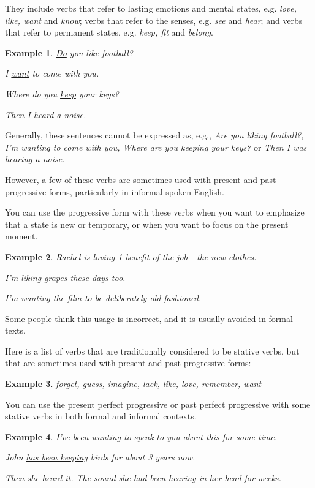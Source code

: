 \documentclass[oneside]{book}
\numberwithin{equation}{section}
\newtheorem{example}{Example}[section]
\begin{document}
They include verbs that refer to lasting emotions and mental states, e.g. \textit{love, like, want} and \textit{know}; verbs that refer to the senses, e.g. \textit{see} and \textit{hear}; and verbs that refer to permanent states, e.g. \textit{keep, fit} and \textit{belong}.
\begin{example}
    \underline{Do} you like football?
    
    I \underline{want} to come with you.
    
    Where do you \underline{keep} your keys?
    
    Then I \underline{heard} a noise.
\end{example}
Generally, these sentences cannot be expressed as, e.g., \textit{Are you liking football?, I'm wanting to come with you, Where are you keeping your keys?} or \textit{Then I was hearing a noise}.

%
However, a few of these verbs are sometimes used with present and past progressive forms, particularly in informal spoken English.

You can use the progressive form with these verbs when you want to emphasize that a state is new or temporary, or when you want to focus on the present moment.
\begin{example}
    Rachel \underline{is loving} 1 benefit of the job - the new clothes.
    
    I\underline{'m liking} grapes these days too.
    
    I\underline{'m wanting} the film to be deliberately old-fashioned.
\end{example}
Some people think this usage is incorrect, and it is usually avoided in formal texts.

%
Here is a list of verbs that are traditionally considered to be stative verbs, but that are sometimes used with present and past progressive forms:
\begin{example}
    forget, guess, imagine, lack, like, love, remember, want
\end{example}
You can use the present perfect progressive or past perfect progressive with some stative verbs in both formal and informal contexts.
\begin{example}
    I\underline{'ve been wanting} to speak to you about this for some time.
    
    John \underline{has been keeping} birds for about 3 years now.
    
    Then she heard it. The sound she \underline{had been hearing} in her head for weeks.
\end{example}
\end{document}
